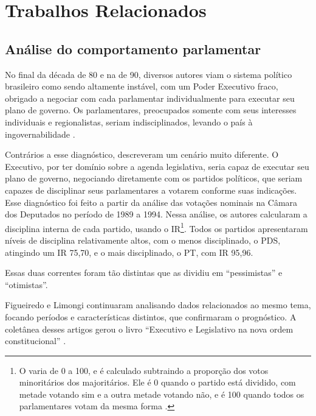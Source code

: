 \chapter{Trabalhos Relacionados}\label{cap:trabalhos-relacionados}


\section{Análise do comportamento parlamentar}
\label{cap:trabalhos-relacionados:analise-comportamento}

No final da década de 80 e na de 90, diversos autores viam o sistema político
brasileiro como sendo altamente instável, com um Poder Executivo fraco,
obrigado a negociar com cada parlamentar individualmente para executar seu
plano de governo. Os parlamentares, preocupados somente com seus interesses
individuais e regionalistas, seriam indisciplinados, levando o país à
ingovernabilidade \cite{Abranches1988,Lamounier1994,Mainwaring2001,Ames2003}.

Contrários a esse diagnóstico,  descreveram um cenário
muito diferente. O Executivo, por ter domínio sobre a agenda legislativa,
seria capaz de executar seu plano de governo, negociando diretamente com os partidos
políticos, que seriam capazes de disciplinar seus parlamentares a votarem
conforme suas indicações. Esse diagnóstico foi feito a partir da análise das
votações nominais na Câmara dos Deputados no período de 1989 a 1994. Nessa
análise, os autores calcularam a disciplina interna de cada partido, usando o
\gls{IR}\footnote{O  varia de 0 a 100, e é calculado subtraindo a
proporção dos votos minoritários dos majoritários. Ele é 0 quando o partido
está dividido, com metade votando sim e a outra metade votando não, e é 100
quando todos os parlamentares votam da mesma forma \cite{Rice1924}.}. Todos os
partidos apresentaram níveis de disciplina relativamente altos, com o menos disciplinado,
o PDS, atingindo um \gls{IR} 75,70, e o mais disciplinado, o PT, com \gls{IR} 95,96.

Essas duas correntes foram tão distintas que  as dividiu
em ``pessimistas'' e ``otimistas''.

Figueiredo e Limongi continuaram analisando dados relacionados ao mesmo tema,
focando períodos e características distintos, que confirmaram o prognóstico.
A coletânea desses artigos gerou o livro ``Executivo e Legislativo na nova
ordem constitucional'' \cite{Figueiredo2001}.

